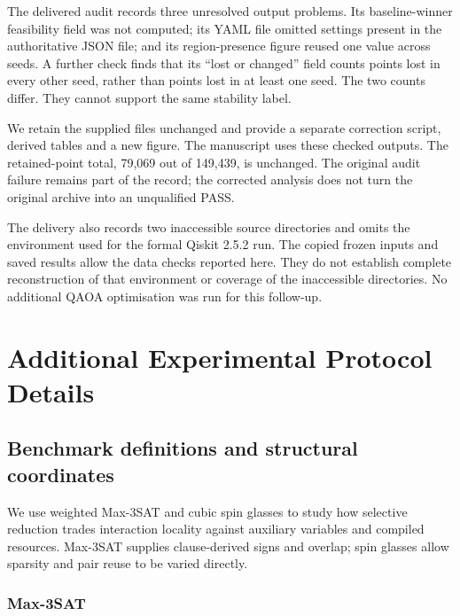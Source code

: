 \documentclass[a4paper,onecolumn,11pt,unpublished]{quantumarticle}
\theoremstyle{remark}
\begin{document}
The delivered audit records three unresolved output problems. Its
baseline-winner feasibility field was not computed; its YAML file omitted
settings present in the authoritative JSON file; and its region-presence
figure reused one value across seeds. A further check finds that its
``lost or changed'' field counts points lost in every other seed, rather
than points lost in at least one seed. The two counts differ. They cannot
support the same stability label.

We retain the supplied files unchanged and provide a separate correction
script, derived tables and a new figure. The manuscript uses these checked
outputs. The retained-point total, 79,069 out of 149,439, is unchanged.
The original audit failure remains part of the record; the corrected
analysis does not turn the original archive into an unqualified PASS.

The delivery also records two inaccessible source directories and omits
the environment used for the formal Qiskit 2.5.2 run. The copied frozen
inputs and saved results allow the data checks reported here.
They do not establish complete reconstruction of that environment or
coverage of the inaccessible directories. No additional QAOA optimisation
was run for this follow-up.

\section{Additional Experimental Protocol Details}
\label{app:experimental-details}

\subsection{Benchmark definitions and structural coordinates}
\label{sec:applications}

We use weighted Max-3SAT and cubic spin glasses to study how selective
reduction trades interaction locality against auxiliary variables and compiled
resources. Max-3SAT supplies clause-derived signs and overlap; spin glasses
allow sparsity and pair reuse to be varied directly.

\subsubsection{Max-3SAT}
\end{document}
